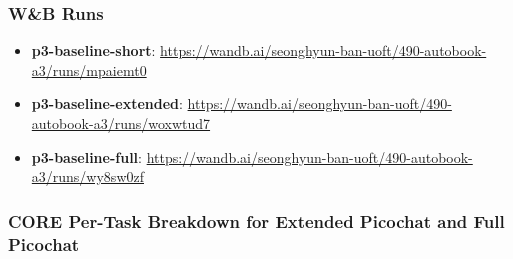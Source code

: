 \documentclass[11pt]{article}
\begin{document}
\subsubsection*{W\&B Runs}

\begin{itemize}
  \item \textbf{p3-baseline-short}: \url{https://wandb.ai/seonghyun-ban-uoft/490-autobook-a3/runs/mpaiemt0}
  \item \textbf{p3-baseline-extended}: \url{https://wandb.ai/seonghyun-ban-uoft/490-autobook-a3/runs/woxwtud7}
  \item \textbf{p3-baseline-full}: \url{https://wandb.ai/seonghyun-ban-uoft/490-autobook-a3/runs/wy8sw0zf}
\end{itemize}

\subsubsection*{CORE Per-Task Breakdown for Extended Picochat and Full Picochat}
\end{document}
